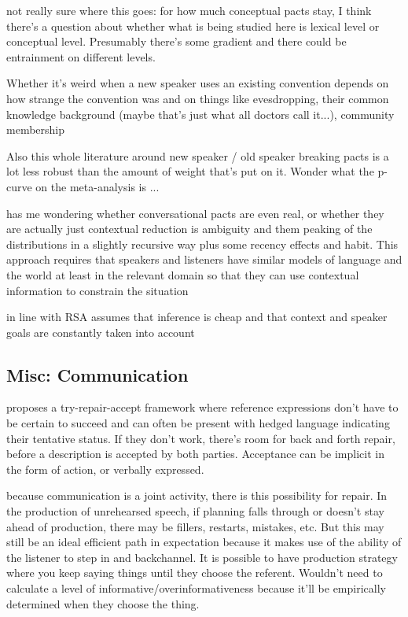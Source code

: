 \documentclass[]{article}
\begin{document}
 not really sure where this goes: \cite{metzing2003a} for how much conceptual pacts stay, I think there's a question about whether what is being studied here is lexical level or conceptual level. Presumably there's some gradient and there could be entrainment on different levels. 
 
 Whether it's weird when a new speaker uses an existing convention depends on how strange the convention was and on things like evesdropping, their common knowledge background (maybe that's just what all doctors call it...), community membership
 
 Also this whole literature around new speaker / old speaker breaking pacts is a lot less robust than the amount of weight that's put on it. Wonder what the p-curve on the meta-analysis is ... 
 
 \cite{piantadosi2012} has me wondering whether conversational pacts are even real, or whether they are actually just contextual reduction is ambiguity and them peaking of the distributions in a slightly recursive way plus some recency effects and habit. This approach requires that speakers and listeners have similar models of language and the world at least in the relevant domain so that they can use contextual information to constrain the situation 
 
 \cite{piantadosi2012} in line with RSA assumes that inference is cheap and that context and speaker goals are constantly taken into account 

\subsection{Misc: Communication}

\cite{clark1986} proposes a try-repair-accept framework where reference expressions don't have to be certain to succeed and can often be present with hedged language indicating their tentative status. If they don't work, there's room for back and forth repair, before a description is accepted by both parties. Acceptance can be implicit in the form of action, or verbally expressed. 

\cite{clark1986} because communication is a joint activity, there is this possibility for repair. In the production of unrehearsed speech, if planning falls through or doesn't stay ahead of production, there may be fillers, restarts, mistakes, etc. But this may still be an ideal efficient path in expectation because it makes use of the ability of the listener to step in and backchannel. It is possible to have production strategy where you keep saying things until they choose the referent. Wouldn't need to calculate a level of informative/overinformativeness because it'll be empirically determined when they choose the thing. 
\end{document}
